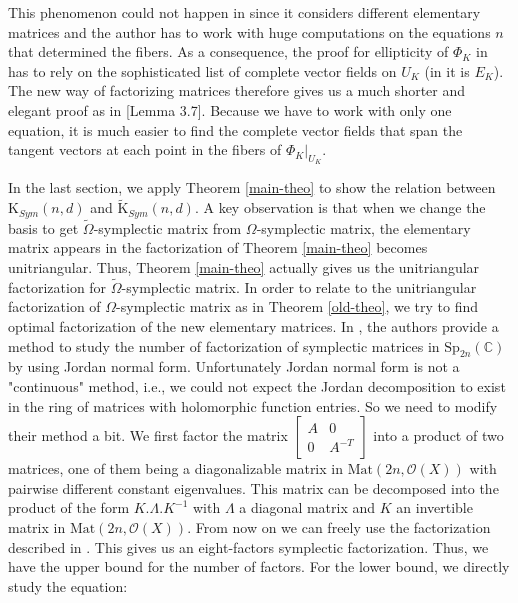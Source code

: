 \documentclass[10pt]{amsart}
\theoremstyle{remark}
\begin{document}
This phenomenon could not happen in \cite{Scho} since it considers different elementary matrices and the author has to work with huge computations on the equations $n$ that determined the fibers. As a consequence, the proof for ellipticity of $\Phi_K$ in \cite{Scho} has to rely on the sophisticated list of complete vector fields on $U_K$ (in \cite{Scho} it is $E_K$). The new way of factorizing matrices therefore gives us a much shorter and elegant proof as in \cite{KI}[Lemma 3.7]. Because we have to work with only one equation, it is much easier to find the complete vector fields that span the tangent vectors at each point in the fibers of $\Phi_K|_{U_K}$.

In the last section, we apply Theorem \ref{main-theo} to show the relation between $ \mathrm{K}_{Sym}(n,d)$ and $\tilde{\mathrm{K}}_{Sym}(n,d)$. A key observation is that when we change the basis to get $\tilde{\Omega}$-symplectic matrix from $\Omega$-symplectic matrix, the elementary matrix appears in the factorization of Theorem \ref{main-theo} becomes unitriangular. Thus, Theorem \ref{main-theo} actually gives us the unitriangular factorization for $\tilde{\Omega}$-symplectic matrix. In order to relate to the unitriangular factorization of $\Omega$-symplectic matrix as in Theorem \ref{old-theo}, we try to find optimal factorization of the new elementary matrices. In \cite{JLX2}, the authors provide a method to study the number of factorization of symplectic matrices in $\mathrm{Sp}_{2n}(\mathbb{C})$ by using Jordan normal form. Unfortunately Jordan normal form is not a "continuous" method, i.e., we could not expect the Jordan decomposition to exist in the ring of matrices with holomorphic function entries. So we need to modify their method a bit. We first factor the matrix $\left[\begin{array}{ccc} A & 0 \\ 0 & A^{-T}\end{array}\right] $ into a product of two matrices, one of them being a diagonalizable matrix in $\mathrm{Mat}(2n,\mathcal{O}(X))$ with pairwise different constant eigenvalues. This matrix can be decomposed into the product of the form $K.\Lambda.K^{-1}$ with $\Lambda$ a diagonal matrix and $K$ an invertible matrix in $\mathrm{Mat}(2n,\mathcal{O}(X))$. From now on we can freely use the factorization described in \cite{JLX2}. This gives us an eight-factors symplectic factorization. Thus, we have the upper bound for the number of factors. For the lower bound, we directly study the equation: 
\end{document}
